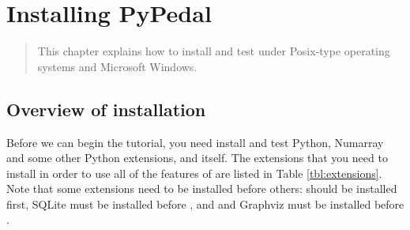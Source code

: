 \chapter{Installing PyPedal}
\label{cha:installation}
\begin{quote}
This chapter explains how to install and test \PyPedal{} under Posix-type operating systems and Microsoft Windows.
\end{quote}
\section{Overview of installation}
\label{sec:installation-overview}
Before we can begin the tutorial, you need install and test Python, Numarray and some other Python extensions, and \PyPedal{} itself. The extensions that you need to install in order to use all of the features of \PyPedal{} are listed in Table \ref{tbl:extensions}.  Note that some extensions need to be installed before others:  should be installed first, SQLite must be installed before , and  and Graphviz must be installed before .

